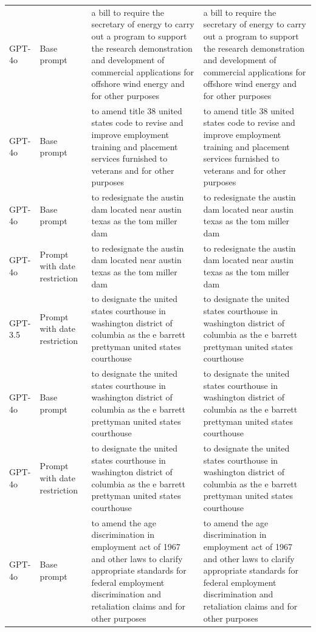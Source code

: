 \begin{longtable}{>{\raggedright\arraybackslash}p{1.4cm}>{\raggedright\arraybackslash}p{1.4cm}>{\raggedright\arraybackslash}p{5.5cm}>{\raggedright\arraybackslash}p{5.5cm}}
GPT-4o & Base prompt & a bill to require the secretary of energy to carry out a program to support the research demonstration and development of commercial applications for offshore wind energy and for other purposes & a bill to require the secretary of energy to carry out a program to support the research demonstration and development of commercial applications for offshore wind energy and for other purposes\\
GPT-4o & Base prompt & to amend title 38 united states code to revise and improve employment training and placement services furnished to veterans and for other purposes & to amend title 38 united states code to revise and improve employment training and placement services furnished to veterans and for other purposes\\
GPT-4o & Base prompt & to redesignate the austin dam located near austin texas as the tom miller dam & to redesignate the austin dam located near austin texas as the tom miller dam\\
GPT-4o & Prompt with date restriction & to redesignate the austin dam located near austin texas as the tom miller dam & to redesignate the austin dam located near austin texas as the tom miller dam\\
GPT-3.5 & Prompt with date restriction & to designate the united states courthouse in washington district of columbia as the e barrett prettyman united states courthouse & to designate the united states courthouse in washington district of columbia as the e barrett prettyman united states courthouse\\
GPT-4o & Base prompt & to designate the united states courthouse in washington district of columbia as the e barrett prettyman united states courthouse & to designate the united states courthouse in washington district of columbia as the e barrett prettyman united states courthouse\\
GPT-4o & Prompt with date restriction & to designate the united states courthouse in washington district of columbia as the e barrett prettyman united states courthouse & to designate the united states courthouse in washington district of columbia as the e barrett prettyman united states courthouse\\
GPT-4o & Base prompt & to amend the age discrimination in employment act of 1967 and other laws to clarify appropriate standards for federal employment discrimination and retaliation claims and for other purposes & to amend the age discrimination in employment act of 1967 and other laws to clarify appropriate standards for federal employment discrimination and retaliation claims and for other purposes\\

\end{longtable}
